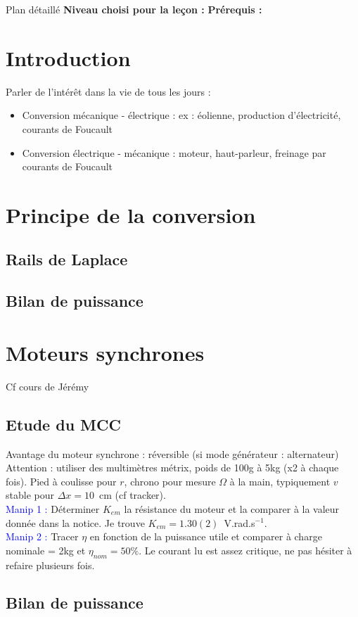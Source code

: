 \begin{reportBlock}{Plan détaillé}
  \textbf{Niveau choisi pour la leçon :} 
  \newline
  \textbf{Prérequis : }
  \newline

\section*{Introduction}
Parler de l'intérêt dans la vie de tous les jours :
\begin{itemize}
    \item Conversion mécanique - électrique : ex : éolienne, production d'électricité, courants de Foucault
    \item Conversion électrique - mécanique : moteur, haut-parleur, freinage par courants de Foucault
\end{itemize}

\section{Principe de la conversion}
\subsection{Rails de Laplace}
\subsection{Bilan de puissance}

\section{Moteurs synchrones}
Cf cours de Jérémy
\subsection{Etude du MCC}
Avantage du moteur synchrone : réversible (si mode générateur : alternateur)
Attention : utiliser des multimètres métrix, poids de 100g à 5kg (x2 à chaque fois). Pied à coulisse pour $r$, chrono pour mesure $\Omega$ à la main, typiquement $v$ stable pour $\Delta x=10$~cm (cf tracker).\\
\textcolor{blue}{Manip 1 : }Déterminer $K_{em}$ la résistance du moteur et la comparer à la valeur donnée dans la notice. Je trouve $K_{em}=1.30(2)$~V.rad.s$^{-1}$.\\
\textcolor{blue}{Manip 2 :} Tracer $\eta$ en fonction de la puissance utile et comparer à charge nominale = 2kg et $\eta_{nom}=50\%$. Le courant lu est assez critique, ne pas hésiter à refaire plusieurs fois.

\subsection{Bilan de puissance}

\end{reportBlock}